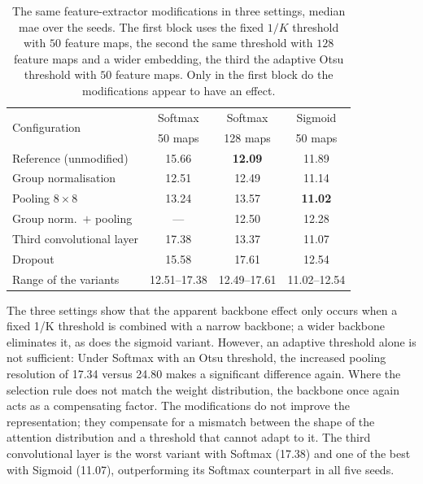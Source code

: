 \documentclass[12pt,parskip = half, DIV=classic,listof=totoc]{scrartcl}
\begin{document}
			\begin{table}[htbp]
				\centering
				\footnotesize
					\begin{tabular}{@{}lccc@{}}
						\toprule
						\multirow{2}{*}{Configuration} & Softmax & Softmax & Sigmoid \\
						 & 50 maps & 128 maps & 50 maps \\
						\midrule
						Reference (unmodified)      & 15.66 & \textbf{12.09} & 11.89 \\
						Group normalisation         & 12.51 & 12.49 & 11.14 \\
						Pooling $8\times8$          & 13.24 & 13.57 & \textbf{11.02} \\
						Group norm.\ $+$ pooling    & ---   & 12.50 & 12.28 \\
						Third convolutional layer   & 17.38 & 13.37 & 11.07 \\
						Dropout                     & 15.58 & 17.61 & 12.54 \\
						\midrule
						Range of the variants       & 12.51--17.38 & 12.49--17.61 & 11.02--12.54 \\
						\bottomrule
					\end{tabular}
					\caption[The same feature-extractor modifications in three settings, median \acs*{mae} over the seeds]{The same feature-extractor modifications in three settings, median \ac{mae} over the seeds.
					The first block uses the fixed $1/K$ threshold with $50$ feature maps, the second the same
					threshold with $128$ feature maps and a wider embedding, the third the adaptive Otsu threshold
					with $50$ feature maps. Only in the first block do the modifications appear to have an effect.}
					\label{tab:gwhd_backbones}
			\end{table}

			The three settings show that the apparent backbone effect only occurs when 
			a fixed 1/K threshold is combined with a narrow
			backbone; a wider backbone eliminates it, as does the sigmoid variant.
			However, an adaptive threshold alone is not sufficient: Under Softmax with
			an Otsu threshold, the increased pooling resolution of 17.34 versus 24.80
			makes a significant difference again. Where the selection rule does not
			match the weight distribution, the backbone once again acts as a compensating factor. The modifications
			do not improve the representation; they compensate for a mismatch
			between the shape of the attention distribution and a threshold that cannot
			adapt to it. The third convolutional layer is the worst variant with Softmax (17.38)
			and one of the best with Sigmoid (11.07), outperforming its Softmax counterpart in
			all five seeds.
			
\end{document}
